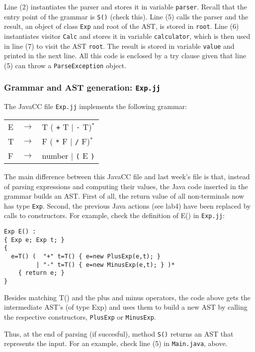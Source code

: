 \documentclass{article}
\begin{document}
Line (2) instantiates the parser and stores it in variable {\tt parser}. Recall that the entry point of the grammar is {\tt S()} (check this). Line (5) calls the parser and the result, an object of class {\tt Exp} and root of the AST, is stored in {\tt root}. Line (6) instantiates visitor {\tt Calc} and stores it in variable {\tt calculator}, which is then used in line (7) to visit the AST {\tt root}. The result is stored in variable {\tt value} and printed in the next line. All this code is enclosed by a try clause given that line (5) can throw a {\tt ParseException} object. 


\subsubsection*{Grammar and AST generation: {\tt Exp.jj}}

The JavaCC file {\tt Exp.jj} implements the following grammar:

\begin{tabular}{lcl}
E & $\rightarrow$ & T ( \verb-+- T $|$ \verb+-+ T)$^*$ \\
T & $\rightarrow$ & F ( \verb+*+ F $|$ \verb+/+ F)$^*$ \\
F & $\rightarrow$ & number $|$ \verb+(+ E \verb+)+\\
\end{tabular}

The main difference between this JavaCC file and last week's file is that, instead of parsing expressions and computing their values, the Java code inserted in the grammar builds an AST. First of all, the return value of all non-terminals now has type {\tt Exp}. Second, the previous Java actions (see lab4) have been replaced by calls to constructors.
For example, check the definition of E() in {\tt Exp.jj}:

\begin{verbatim}
Exp E() :
{ Exp e; Exp t; }
{
  e=T() (  "+" t=T() { e=new PlusExp(e,t); }
         | "-" t=T() { e=new MinusExp(e,t); } )*
    { return e; }
}
\end{verbatim}

Besides matching T() and the plus and minus operators, the code above gets the intermediate AST's (of type Exp) and  uses them to build a new AST by calling the respective constructors, {\tt PlusExp} or {\tt MinusExp}.

Thus, at the end of parsing (if succesful), method {\tt S()} returns an AST that represents the input. For an example, check line (5) in {\tt Main.java}, above.
\end{document}

